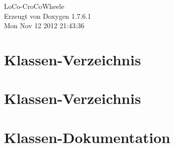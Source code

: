 \documentclass[a4paper]{book}
\begin{document}
\hypersetup{pageanchor=false,citecolor=blue}
\begin{titlepage}
\vspace*{7cm}
\begin{center}
{\Large \-Lo\-Co-\/\-Cro\-Co\-Wheele }\\
\vspace*{1cm}
{\large \-Erzeugt von Doxygen 1.7.6.1}\\
\vspace*{0.5cm}
{\small Mon Nov 12 2012 21:43:36}\\
\end{center}
\end{titlepage}
\clearemptydoublepage
{}
\tableofcontents
\clearemptydoublepage
{}
\hypersetup{pageanchor=true,citecolor=blue}
\chapter{\-Klassen-\/\-Verzeichnis}

\chapter{\-Klassen-\/\-Verzeichnis}

\chapter{\-Klassen-\/\-Dokumentation}















\printindex
\end{document}
